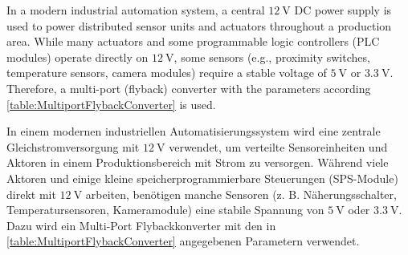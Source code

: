 



In a modern industrial automation system, a central $\SI{12}{\volt}$ DC power supply is used to power distributed sensor units and actuators throughout a production area.
While many actuators and some programmable logic controllers (PLC modules) operate directly on $\SI{12}{\volt}$, some sensors (e.g., proximity switches, temperature sensors, 
camera modules) require a stable voltage of $\SI{5}{\volt}$ or $\SI{3.3}{\volt}$. Therefore, a multi-port (flyback) converter with the parameters according 
\autoref{table:MultiportFlybackConverter} is used.

\begin{germanblock}
In einem modernen industriellen Automatisierungssystem wird eine zentrale Gleichstromversorgung mit $\SI{12}{\volt}$ verwendet, um verteilte Sensoreinheiten und Aktoren
 in einem Produktionsbereich mit Strom zu versorgen. Während viele Aktoren und einige kleine speicherprogrammierbare Steuerungen (SPS-Module) direkt mit $\SI{12}{\volt}$ arbeiten, 
benötigen manche Sensoren (z. B. Näherungsschalter, Temperatursensoren, Kameramodule) eine stabile Spannung von $\SI{5}{\volt}$ oder $\SI{3.3}{\volt}$. Dazu wird ein Multi-Port Flybackkonverter
mit den in \autoref{table:MultiportFlybackConverter} angegebenen Parametern verwendet.
\end{germanblock}

